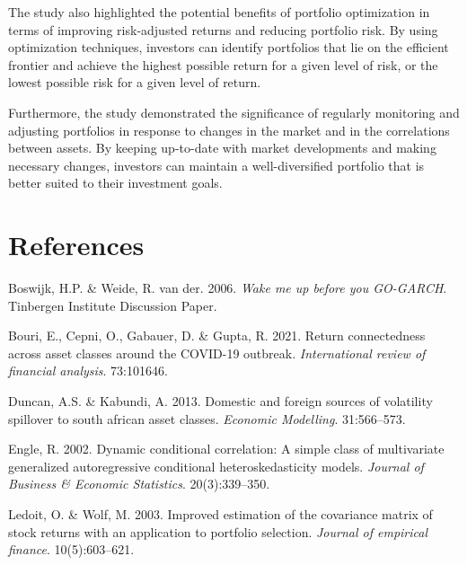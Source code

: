 \documentclass[11pt,preprint, authoryear]{elsarticle}
\numberwithin{equation}{section}
\numberwithin{figure}{section}
\numberwithin{table}{section}
\newlength{\cslhangindent}
\newenvironment{CSLReferences}%
  {\setlength{\parindent}{0pt}%
  \everypar{\setlength{\hangindent}{\cslhangindent}}\ignorespaces}%
  {\par}
\begin{document}
The study also highlighted the potential benefits of portfolio
optimization in terms of improving risk-adjusted returns and reducing
portfolio risk. By using optimization techniques, investors can identify
portfolios that lie on the efficient frontier and achieve the highest
possible return for a given level of risk, or the lowest possible risk
for a given level of return.

Furthermore, the study demonstrated the significance of regularly
monitoring and adjusting portfolios in response to changes in the market
and in the correlations between assets. By keeping up-to-date with
market developments and making necessary changes, investors can maintain
a well-diversified portfolio that is better suited to their investment
goals.

\newpage

\hypertarget{references}{%
\section*{References}\label{references}}

\hypertarget{refs}{}
\begin{CSLReferences}{1}{0}
\leavevmode{}%
Boswijk, H.P. \& Weide, R. van der. 2006. \emph{Wake me up before you
GO-GARCH}. Tinbergen Institute Discussion Paper.

\leavevmode{}%
Bouri, E., Cepni, O., Gabauer, D. \& Gupta, R. 2021. Return
connectedness across asset classes around the COVID-19 outbreak.
\emph{International review of financial analysis}. 73:101646.

\leavevmode{}%
Duncan, A.S. \& Kabundi, A. 2013. Domestic and foreign sources of
volatility spillover to south african asset classes. \emph{Economic
Modelling}. 31:566--573.

\leavevmode{}%
Engle, R. 2002. Dynamic conditional correlation: A simple class of
multivariate generalized autoregressive conditional heteroskedasticity
models. \emph{Journal of Business \& Economic Statistics}.
20(3):339--350.

\leavevmode{}%
Ledoit, O. \& Wolf, M. 2003. Improved estimation of the covariance
matrix of stock returns with an application to portfolio selection.
\emph{Journal of empirical finance}. 10(5):603--621.

\end{CSLReferences}
\end{document}
